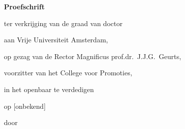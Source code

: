 \begin{titlepage}






\cleardoublepage
\thispagestyle{empty}

\begin{center}


\vspace*{2\bigskipamount}

{\makeatletter
\titlestyle\bfseries\LARGE\@title
\makeatother}

{\makeatletter
\ifx\@subtitle\undefined\else
    \bigskip
    \titlefont\titleshape\Large\@subtitle
\fi
\makeatother}

\vfill


{\Large\titlefont\bfseries Proefschrift}

\bigskip
\bigskip

ter verkrijging van de graad van doctor

aan Vrije Universiteit Amsterdam,

op gezag van de Rector Magnificus prof.dr.~J.J.G.~Geurts,

voorzitter van het College voor Promoties,

in het openbaar te verdedigen

op [onbekend]

\bigskip
\bigskip

door

\bigskip
\bigskip


\end{center}
\end{titlepage}
